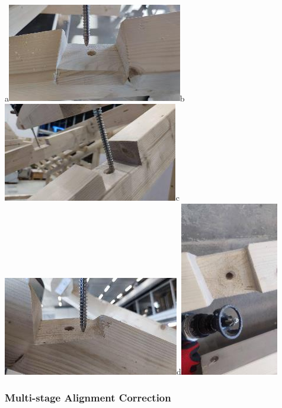 \documentclass[11pt]{book}
\begin{document}
{\footnotesize a\includegraphics[width=7.64cm,height=4.3cm]{./images/image7.jpeg}b\includegraphics[width=7.64cm,height=4.3cm]{./images/image8.jpeg}c\includegraphics[width=7.67cm,height=4.3cm]{./images/image9.jpeg}d\includegraphics[width=4.3cm,height=7.64cm]{./images/image10.jpeg}}

\vspace{1\baselineskip}
\subsubsection{Multi-stage Alignment Correction}
\end{document}
